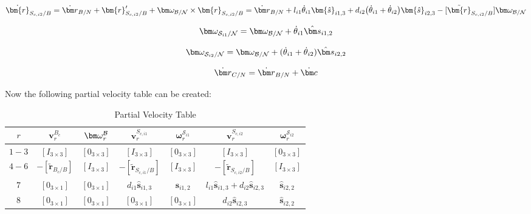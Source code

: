 \documentclass[paper]{aiaaNew}
\begin{document}
\begin{equation}
\dot{\bm{r}}_{S_{c,{i2}}/B} = \dot{\bm r}_{B/N} + \bm{r}'_{S_{c,{i2}}/B} + \bm \omega_{\cal{B/N}} \times \bm{r}_{S_{c,{i2}}/B} = \dot{\bm r}_{B/N} +l_{i1} \dot{\theta}_{i1} \bm{\hat{s}}_{i1,3} + d_{i2}\big(\dot{\theta}_{i1} + \dot{\theta}_{i2}\big)\bm{\hat{s}}_{i2,3}  - [\tilde{\bm{r}}_{S_{c,{i2}}/B}] \bm \omega_{\cal{B/N}}
\end{equation}

\begin{equation}
\bm \omega_{\mathcal{S}_{i1}/\mathcal{N}} = \bm \omega_{\cal{B/N}} + \dot{\theta}_{i1} \hat{\bm s}_{i1,2}
\end{equation}

\begin{equation}
\bm \omega_{\mathcal{S}_{i2}/\mathcal{N}} = \bm \omega_{\cal{B/N}} + (\dot{\theta}_{i1}  + \dot{\theta}_{i2})\hat{\bm s}_{i2,2}
\end{equation}

\begin{equation}
\dot{\bm r}_{C/N} = \dot{\bm r}_{B/N} + \dot{\bm c}\\
\label{eq:rDot_CN}
\end{equation}

Now the following partial velocity table can be created:

\begin{table}[htbp]
	\caption{Partial Velocity Table}
	\label{tab:hub}
	\centering \fontsize{10}{10}\selectfont
	\begin{tabular}{ c | c | c | c | c | c | c } %
		\hline
		$r$  & $\bm v^{B_c}_{r}$  & $\bm \omega_{\textit{r}}^{\cal{B}}$ & $\bm v^{S_{c,i1}}_{r}$ & $\bm \omega_{r}^{\mathcal{S}_{i1}}$ & $\bm v^{S_{c,i2}}_{r}$ & $\bm \omega_{r}^{\mathcal{S}_{i2}}$ \\
		\hline
		$1-3$  & $[I_{3\times 3}]$ & $[0_{3\times 3}]$ & $[I_{3\times 3}]$ & $[0_{3\times 3}]$ & $[I_{3\times 3}]$ & $[0_{3\times 3}]$ \\
		$4-6$ & $- [\tilde{{\bm r}}_{B_c/B}]$ & $[I_{3\times 3}]$ & $- [\tilde{\bm{r}}_{S_{c,{i1}}/B}]$ & $[I_{3\times 3}]$ & $- [\tilde{\bm{r}}_{S_{c,{i2}}/B}]$ & $[I_{3\times 3}]$\\
		$7$ &$[0_{3\times 1}]$ & $[0_{3\times 1}]$ & $d_{i1} \bm{\hat{s}}_{i1,3}$ & $\bm{\hat{s}}_{i1,2}$ & $l_{i1} \bm{\hat{s}}_{i1,3} + d_{i2} \bm{\hat{s}}_{i2,3}$ & $\hat{\bm s}_{i2,2}$ \\
		$8$ &$[0_{3\times 1}]$ & $[0_{3\times 1}]$ & $[0_{3\times 1}]$ & $[0_{3\times 1}]$ & $ d_{i2}\bm{\hat{s}}_{i2,3}$ & $\hat{\bm s}_{i2,2}$ \\
		\hline
	\end{tabular}
\end{table}
\end{document}
